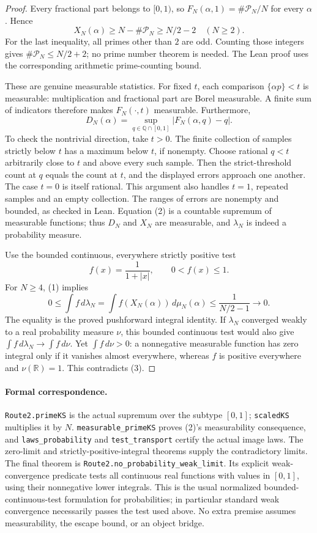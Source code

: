\documentclass[11pt]{article}
\newcommand{\R}{\mathbb R}
\newcommand{\Pp}{\mathcal P}
\begin{document}
\begin{proof}
Every fractional part belongs to $[0,1)$, so
$F_N(\alpha,1)=\#\Pp_N/N$ for every $\alpha$. Hence
\[
 X_N(\alpha)\ge N-\#\Pp_N\ge N/2-2\quad(N\ge2).
\tag{1}
\]
For the last inequality, all primes other than $2$ are odd. Counting those
integers gives $\#\Pp_N\le N/2+2$; no prime number theorem is needed. The Lean
proof uses the corresponding arithmetic prime-counting bound.

These are genuine measurable statistics. For fixed $t$, each comparison
$\{\alpha p\}<t$ is measurable: multiplication and fractional part are Borel
measurable. A finite sum of indicators therefore makes $F_N(\cdot,t)$
measurable. Furthermore,
\[
 D_N(\alpha)=\sup_{q\in\mathbb Q\cap[0,1]}
                   |F_N(\alpha,q)-q|.
\tag{2}
\]
To check the nontrivial direction, take $t>0$. The finite collection of samples
strictly below $t$ has a maximum below $t$, if nonempty. Choose rational $q<t$
arbitrarily close to $t$ and above every such sample. Then the strict-threshold
count at $q$ equals the count at $t$, and the displayed errors approach one
another. The case $t=0$ is itself rational. This argument also handles $t=1$,
repeated samples and an empty collection. The ranges of errors are nonempty
and bounded, as checked in Lean. Equation (2) is a countable supremum of
measurable functions; thus $D_N$ and $X_N$ are measurable, and $\lambda_N$ is
indeed a probability measure.

Use the bounded continuous, everywhere strictly positive test
\[
 f(x)=\frac1{1+|x|},\qquad 0<f(x)\le1.
\]
For $N\ge4$, (1) implies
\[
 0\le\int f\,d\lambda_N
   =\int f(X_N(\alpha))\,d\mu_N(\alpha)
   \le \frac1{N/2-1}\longrightarrow0.
\tag{3}
\]
The equality is the proved pushforward integral identity. If $\lambda_N$
converged weakly to a real probability measure $\nu$, this bounded continuous
test would also give $\int f\,d\lambda_N\to\int f\,d\nu$.
Yet $\int f\,d\nu>0$: a nonnegative measurable function has zero integral only
if it vanishes almost everywhere, whereas $f$ is positive everywhere and
$\nu(\R)=1$. This contradicts (3).
\end{proof}

\paragraph{Formal correspondence.}
\texttt{Route2.primeKS} is the actual supremum over the subtype $[0,1]$;
\texttt{scaledKS} multiplies it by $N$.
\texttt{measurable\_primeKS} proves (2)'s measurability consequence, and
\texttt{laws\_probability} and \texttt{test\_transport} certify the actual image
laws. The zero-limit and strictly-positive-integral theorems supply the
contradictory limits.
The final theorem is \texttt{Route2.no\_probability\_weak\_limit}.
Its explicit weak-convergence predicate tests all continuous real functions
with values in $[0,1]$, using their nonnegative lower integrals. This is the
usual normalized bounded-continuous-test formulation for probabilities; in
particular standard weak convergence necessarily passes the test used above.
No extra premise assumes measurability, the escape bound, or an object bridge.
\end{document}
